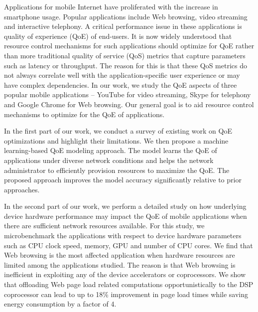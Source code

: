 
Applications for mobile Internet have proliferated with the increase in smartphone usage. Popular applications include Web browsing, video streaming and interactive telephony. A critical performance issue in these applications is quality of experience (QoE) of end-users. It is now widely understood that resource control mechanisms for such applications should optimize for QoE rather than more traditional quality of service (QoS) metrics that capture parameters such as latency or throughput.  The reason for this is that these QoS metrics do not always correlate well with the application-specific user experience or may have complex dependencies. In our work, we study the QoE aspects of three popular mobile applications -- YouTube for video streaming, Skype for telephony and Google Chrome for Web browsing. Our general goal is to aid resource control mechanisms to optimize for the QoE of applications. 
     
In the first part of our work, we conduct a survey of existing work on QoE optimizations and highlight their limitations. We then propose a machine learning-based QoE modeling approach. 
The model learns the QoE of applications under diverse network conditions and helps the network administrator to efficiently provision resources to maximize the QoE. The proposed approach improves the model accuracy significantly relative to prior approaches. 
      
In the second part of our work, we perform a detailed study on how underlying device hardware performance may impact the QoE of mobile applications when there are sufficient network resources available. For this study, we microbenchmark the applications with respect to device hardware parameters such as CPU clock speed, memory, GPU and number of CPU cores. We find that Web browsing is the most affected application when hardware resources are limited among the applications studied. The reason is that Web browsing is inefficient in exploiting any of the device accelerators or coprocessors. We show that offloading Web page load related computations opportunistically to the DSP coprocessor can lead to up to 18\% improvement in page load times while saving energy consumption by a factor of 4.

